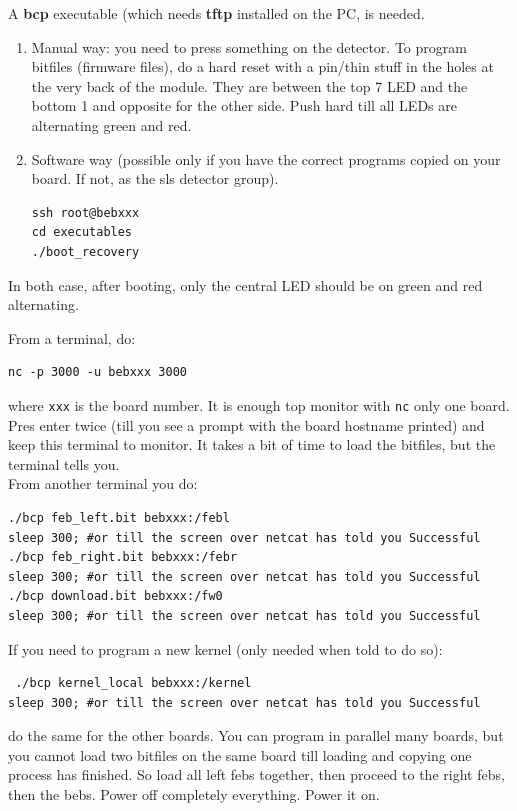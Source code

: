\documentclass{article}
\begin{document}
A \textbf{bcp} executable (which needs \textbf{tftp} installed on the PC, is needed. 
\begin{enumerate}
\item Manual way: you need to press something on the detector. To program bitfiles (firmware files), do a hard reset with a pin/thin stuff in the holes at the very back of the module. They are between the top 7 LED and the bottom 1 and opposite for the other side. Push hard till all LEDs are alternating green and red.
\item Software way (possible only if you have the correct programs copied on your board. If not, as the sls detector group). 
\begin{verbatim}
ssh root@bebxxx
cd executables
./boot_recovery 
 \end{verbatim} 
\end{enumerate}
In both case, after booting, only the central LED should be on green and red alternating. 

From a terminal, do:
\begin{verbatim}
nc -p 3000 -u bebxxx 3000 
\end{verbatim} 
where {\tt{xxx}} is the board number. It is enough top monitor with {\tt{nc}} only one board. Pres enter twice (till you see a prompt with the board hostname printed) and keep this terminal to monitor. It takes a bit of time to load the bitfiles, but the terminal tells you.\\
From another terminal you do:
\begin{verbatim}
./bcp feb_left.bit bebxxx:/febl
sleep 300; #or till the screen over netcat has told you Successful
./bcp feb_right.bit bebxxx:/febr
sleep 300; #or till the screen over netcat has told you Successful
./bcp download.bit bebxxx:/fw0
sleep 300; #or till the screen over netcat has told you Successful
\end{verbatim}
If you need to program a new kernel (only needed when told to do so):
\begin{verbatim}
 ./bcp kernel_local bebxxx:/kernel
sleep 300; #or till the screen over netcat has told you Successful
\end{verbatim}
do the same for the other boards. You can program in parallel many boards, but you cannot load two bitfiles on the same board till loading and copying one process has finished. So load all left febs together, then proceed to the right febs, then the bebs. Power off completely everything. Power it on.
\end{document}
